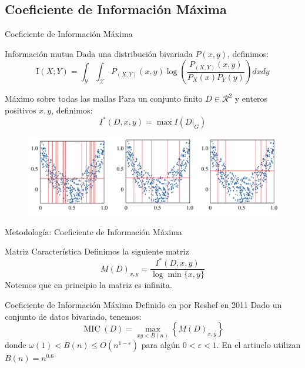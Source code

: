 \documentclass{beamer}
\begin{document}
\subsection{Coeficiente de Información Máxima}
\begin{frame}{Coeficiente de Información Máxima}
     
    \begin{block}{Información mutua}
    Dada una distribución bivariada $P(x,y)$, definimos:
        \begin{equation}
            \mathrm{I}(X ; Y)=\int_{\mathcal{Y}} \int_{\mathcal{X}} P_{(X, Y)}(x, y) \log \left(\frac{P_{(X, Y)}(x, y)}{P_{X}(x) P_{Y}(y)}\right)dxdy
        \end{equation}
    \end{block}


    \begin{block}{Máximo sobre todas las mallas}
        Para un conjunto finito $D\in\mathcal{R}  ^2$ y enteros positivos $x,y$, definimos:
		$$
		I^*(D,x,y)=\max I(D|_G)
		$$
    \end{block}
    \begin{figure}
        \centering
        \includegraphics[scale=0.6]{rsos201424f03.png}
    \end{figure}
\end{frame}

\begin{frame}{Metodología: Coeficiente de Información Máxima}
    \begin{block}{Matriz Característica}
        Definimos la siguiente matriz       
        \begin{equation}
	    	M(D)_{x, y}=\frac{I^{*}(D, x, y)}{\log \min \{x, y\}}
        \end{equation}
        Notemos que en principio la matriz es infinita.
    \end{block}
     

    \begin{block}{Coeficiente de Información Máxima}
        Definido en por Reshef en 2011 \cite{reshef2011} Dado un conjunto de datos bivariado, tenemos:
        \begin{equation}
	    	\operatorname{MIC}(D)=\max _{x y<B(n)}\left\{M(D)_{x, y}\right\}
        \end{equation}
        donde $\omega(1)<B(n) \leq O\left(n^{1-\varepsilon}\right)$ para alg\'un $0<\varepsilon<1$. En el artiuclo utilizan $B(n)=n^{0.6}$
    \end{block}
\end{frame}
\end{document}
